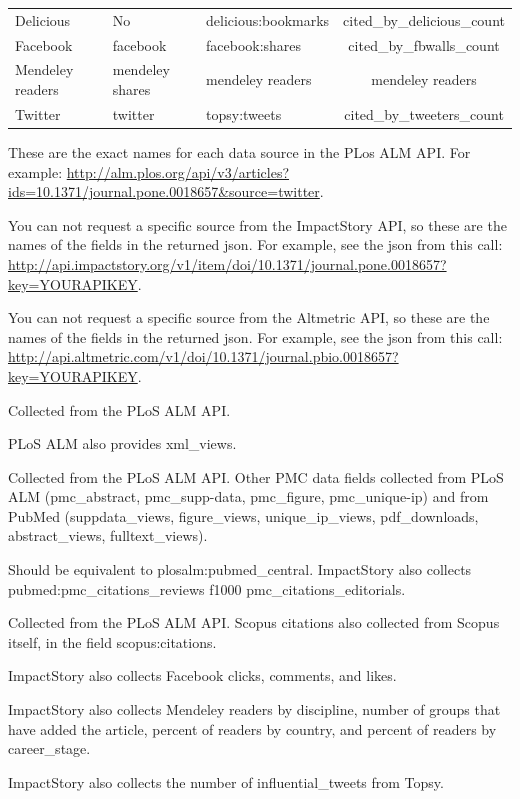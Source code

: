 \documentclass[letterpaper,superscriptaddress,showkeys,longbibliography]{revtex4-1}\usepackage{graphicx, color}
\newcommand{\rowcol}{\rowcolor{tablerowcolor}} %
\begin{document}
\begin{table}[!ht]
\begin{threeparttable}[b]
\begin{tabular}{|B|B|L|C|}
Delicious & No & delicious:bookmarks & cited\_by\_delicious\_count \\
\rowcol Facebook & facebook & facebook:shares & cited\_by\_fbwalls\_count \\
Mendeley readers & mendeley shares & mendeley readers & mendeley readers \\
\rowcol Twitter & twitter & topsy:tweets & cited\_by\_tweeters\_count \\
\hline
\end{tabular}
\begin{tablenotes}
    \item[a] These are the exact names for each data source in the PLos ALM API. For example: \url{http://alm.plos.org/api/v3/articles?ids=10.1371/journal.pone.0018657&source=twitter}.
    \item[b] You can not request a specific source from the ImpactStory API, so these are the names of the fields in the returned json. For example, see the json from this call: \url{http://api.impactstory.org/v1/item/doi/10.1371/journal.pone.0018657?key=YOURAPIKEY}.
    \item[c] You can not request a specific source from the Altmetric API, so these are the names of the fields in the returned json. For example, see the json from this call: \url{http://api.altmetric.com/v1/doi/10.1371/journal.pbio.0018657?key=YOURAPIKEY}.
    \item[d] Collected from the PLoS ALM API. 
    \item[e] PLoS ALM also provides xml\_views. 
    \item[f] Collected from the PLoS ALM API. Other PMC data fields collected from PLoS ALM (pmc\_abstract, pmc\_supp-data, pmc\_figure, pmc\_unique-ip) and from PubMed (suppdata\_views, figure\_views, unique\_ip\_views, pdf\_downloads, abstract\_views, fulltext\_views).
    \item[g] Should be equivalent to plosalm:pubmed\_central. ImpactStory also collects pubmed:pmc\_citations\_reviews f1000 pmc\_citations\_editorials.
    \item[h] Collected from the PLoS ALM API. Scopus citations also collected from Scopus itself, in the field scopus:citations.
    \item[i] ImpactStory also collects Facebook clicks, comments, and likes. 
    \item[j] ImpactStory also collects Mendeley readers by discipline, number of groups that have added the article, percent of readers by country, and percent of readers by career\_stage. 
    \item[k] ImpactStory also collects the number of influential\_tweets from Topsy.
\end{tablenotes}
\end{threeparttable}
\end{table}
\end{document}
